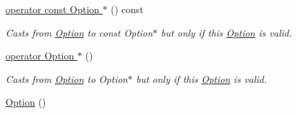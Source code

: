 \begin{DoxyCompactItemize}
\hyperlink{classoption_1_1Option_aaaeedf023bc3f5eee0b199c64d8fe1ec}{operator const Option $\ast$} () const 
\begin{DoxyCompactList}\small\item\em Casts from \hyperlink{classoption_1_1Option}{Option} to const Option$\ast$ but only if this \hyperlink{classoption_1_1Option}{Option} is valid. \end{DoxyCompactList}\item 
\hyperlink{classoption_1_1Option_ac5b9235d79208035d97e41fe17ba04d6}{operator Option $\ast$} ()
\begin{DoxyCompactList}\small\item\em Casts from \hyperlink{classoption_1_1Option}{Option} to Option$\ast$ but only if this \hyperlink{classoption_1_1Option}{Option} is valid. \end{DoxyCompactList}\item 
\hyperlink{classoption_1_1Option_aa2810152fc23b14175b115d1a7d38095}{Option} ()\hypertarget{classoption_1_1Option_aa2810152fc23b14175b115d1a7d38095}{}\label{classoption_1_1Option_aa2810152fc23b14175b115d1a7d38095}


\end{DoxyCompactItemize}
